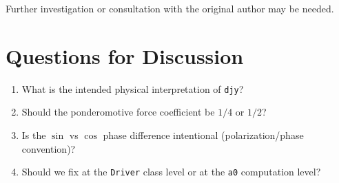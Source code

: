 \documentclass[11pt]{article}
\begin{document}
Further investigation or consultation with the original author may be needed.

\section{Questions for Discussion}

\begin{enumerate}
    \item What is the intended physical interpretation of \texttt{djy}?
    \item Should the ponderomotive force coefficient be $1/4$ or $1/2$?
    \item Is the $\sin$ vs $\cos$ phase difference intentional (polarization/phase convention)?
    \item Should we fix at the \texttt{Driver} class level or at the \texttt{a0} computation level?
\end{enumerate}
\end{document}
